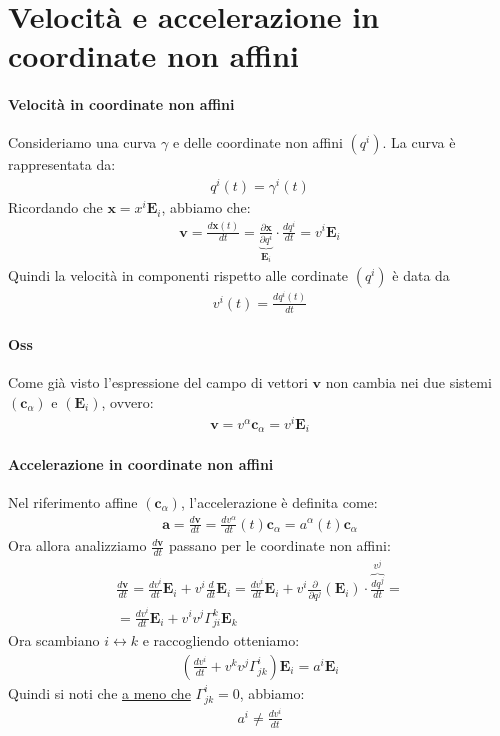 \section{Velocità e accelerazione in coordinate non affini}
\paragraph*{Velocità in coordinate non affini} Consideriamo una curva $\gamma$ e delle coordinate non affini $(q^i)$. La curva è rappresentata da:
\begin{align*}
    q^i(t)=\gamma^i(t)
\end{align*}
Ricordando che $\mathbf{x}=x^i\mathbf{E}_i$, abbiamo che:
\begin{align*}
    \mathbf{v}=\frac{d\mathbf{x}(t)}{dt}=\underbrace{\frac{\partial \mathbf{x}}{\partial q^i}}_{\mathbf{E}_i}\cdot \frac{dq^i}{dt}=v^i\mathbf{E}_i
\end{align*}
Quindi la velocità in componenti rispetto alle cordinate $(q^i)$ è data da 
\begin{align*}
    v^i(t)=\frac{dq^i(t)}{dt}
\end{align*}
\paragraph*{Oss} Come già visto l'espressione del campo di vettori $\mathbf{v}$ non cambia nei due sistemi $(\mathbf{c}_\alpha)$ e $(\mathbf{E}_i)$, ovvero:
\begin{align*}
    \mathbf{v}=v^\alpha \mathbf{c}_\alpha = v^i\mathbf{E}_i
\end{align*}
\paragraph*{Accelerazione in coordinate non affini} Nel riferimento affine $(\mathbf{c}_\alpha)$, l'accelerazione è definita come:
\begin{align*}
    \mathbf{a}=\frac{d\mathbf{v}}{dt}=\frac{dv^\alpha}{dt}(t)\mathbf{c}_\alpha=a^\alpha(t)\mathbf{c}_\alpha
\end{align*}
Ora allora analizziamo $\frac{d\mathbf{v}}{dt}$ passano per le coordinate non affini:
\begin{align*}
    \frac{d\mathbf{v}}{dt}=\frac{dv^i}{dt}\mathbf{E}_i+v^i\frac{d}{dt}\mathbf{E}_i=\frac{dv^i}{dt}\mathbf{E}_i+v^i\frac{\partial}{\partial q^j}(\mathbf{E}_i)\cdot\overbrace{\frac{dq^j}{dt}}^{v^j}=\\
    =\frac{dv^i}{dt}\mathbf{E}_i+v^iv^j\Gamma^k_{ji}\mathbf{E}_k
\end{align*}
Ora scambiano $i\leftrightarrow k$ e raccogliendo otteniamo:
\begin{align*}
    (\frac{dv^i}{dt}+v^kv^j\Gamma_{jk}^i)\mathbf{E}_i=a^i\mathbf{E}_i
\end{align*}
Quindi si noti che \underline{a meno che} $\Gamma_{jk}^i=0$, abbiamo:
\begin{align*}
    a^i\ne \frac{dv^i}{dt}
\end{align*}
